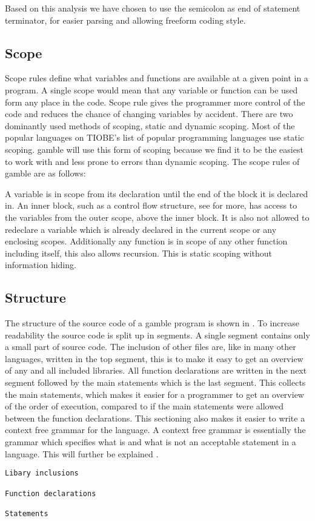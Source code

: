 Based on this analysis we have chosen to use the semicolon as end of statement terminator, for easier parsing and allowing freeform coding style.

\subsection*{Scope}\label{subsec:Scope}
Scope rules define what variables and functions are available at a given point in a program.
A single scope would mean that any variable or function can be used form any place in the code. 
Scope rule gives the programmer more control of the code and reduces the chance of changing variables by accident.
There are two dominantly used methods of scoping, static and dynamic scoping.
Most of the popular languages on TIOBE's list of popular programming languages use static scoping. \citep{TIOBE}
\gls{gamble} will use this form of scoping because we find it to be the easiest to work with and less prone to errors than dynamic scoping.
The scope rules of \gls{gamble} are as follows:

A variable is in scope from its declaration until the end of the block it is declared in.
An inner block, such as a control flow structure, see  for more, has access to the variables from the outer scope, above the inner block. 
It is also not allowed to redeclare a variable which is already declared in the current scope or any enclosing scopes. 
Additionally any function is in scope of any other function including itself, this also allows recursion. 
This is static scoping without information hiding. 

\subsection*{Structure}\label{subsec:Struc}
The structure of the source code of a \gls{gamble} program is shown in .
To increase readability the source code is split up in segments.
A single segment contains only a small part of source code.
The inclusion of other files are, like in many other languages, written in the top segment, this is to make it easy to get an overview of any and all included libraries. 
All function declarations are written in the next segment followed by the main statements which is the last segment.
This collects the main statements, which makes it easier for a programmer to get an overview of the order of execution, compared to if the main statements were allowed between the function declarations.
This sectioning also makes it easier to write a context free grammar for the language. 
A context free grammar is essentially the grammar which specifies what is and what is not an acceptable statement in a language. This will further be explained .

\begin{lstlisting}[caption={Source code file layout in \gls{gamble}},frame=tlrb,label={lst:Structure}, numbers=none]
Libary inclusions

Function declarations

Statements
\end{lstlisting}                           